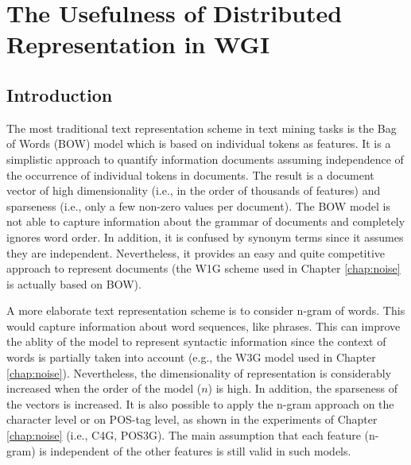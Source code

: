 
\chapter{The Usefulness of Distributed Representation in WGI}

\label{chap:word_embeddings}



\newcommand{\keyword}[1]{\textbf{#1}}
\newcommand{\tabhead}[1]{\textbf{#1}}
\newcommand{\code}[1]{\texttt{#1}}
\newcommand{\file}[1]{\texttt{\bfseries#1}}
\newcommand{\option}[1]{\texttt{\itshape#1}}


\section{Introduction}\label{chap:word_embeddings:sec:intro}
 
The most traditional text representation scheme in text mining tasks is the Bag of Words (BOW) model which is based on individual tokens as features. It is a simplistic approach to quantify information documents assuming independence of the occurrence of individual tokens in documents. The result is a document vector of high dimensionality (i.e., in the order of thousands of features) and sparseness (i.e., only a few non-zero values per document). The BOW model is not able to capture information about the grammar of documents and completely ignores word order. In addition, it is confused by synonym terms since it assumes they are independent. Nevertheless, it provides an easy and quite competitive approach to represent documents (the W1G scheme used in Chapter \ref{chap:noise} is actually based on BOW).

A more elaborate text representation scheme is to consider n-gram of words. This would capture information about word sequences, like phrases. This can improve the ablity of the model to represent syntactic information since the context of words is partially taken into account (e.g., the W3G model used in Chapter \ref{chap:noise}). Nevertheless, the dimensionality of representation is considerably increased when the order of the model ($n$) is high. In addition, the sparseness of the vectors is increased. It is also possible to apply the n-gram approach on the character level or on POS-tag level, as shown in the experiments of Chapter \ref{chap:noise} (i.e., C4G, POS3G). The main assumption that each feature (n-gram) is independent of the other features is still valid in such models.

